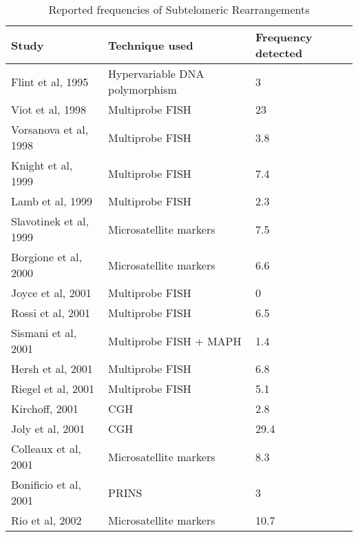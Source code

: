 \begin{table}[]
\caption{Reported frequencies of Subtelomeric Rearrangements}
\label{tab:my_label}


\begin{tabular}{ | l | l | l | }
\hline
	Study                  & Technique used                 & Frequency detected \\ \hline
	Flint et al, 1995      & Hypervariable DNA polymorphism & 3                  \\ \hline
	Viot et al, 1998       & Multiprobe FISH                & 23                 \\ \hline
	Vorsanova et al, 1998  & Multiprobe FISH                & 3.8                \\ \hline
	Knight et al, 1999     & Multiprobe FISH                & 7.4                \\ \hline
	Lamb et al, 1999       & Multiprobe FISH                & 2.3                \\ \hline
	Slavotinek et al, 1999 & Microsatellite markers         & 7.5                \\ \hline
	Borgione et al, 2000   & Microsatellite markers         & 6.6                \\ \hline
	Joyce et al, 2001      & Multiprobe FISH                & 0                  \\ \hline
	Rossi et al, 2001      & Multiprobe FISH                & 6.5                \\ \hline
	Sismani et al, 2001    & Multiprobe FISH + MAPH         & 1.4                \\ \hline
	Hersh et al, 2001      & Multiprobe FISH                & 6.8                \\ \hline
	Riegel et al, 2001     & Multiprobe FISH                & 5.1                \\ \hline
	Kirchoff, 2001         & CGH                            & 2.8                \\ \hline
	Joly et al, 2001       & CGH                            & 29.4               \\ \hline
	Colleaux et al, 2001   & Microsatellite markers         & 8.3                \\ \hline
	Bonificio et al, 2001  & PRINS                          & 3                  \\ \hline
	Rio et al, 2002        & Microsatellite markers         & 10.7               \\ \hline

\end{tabular}
\end{table}
